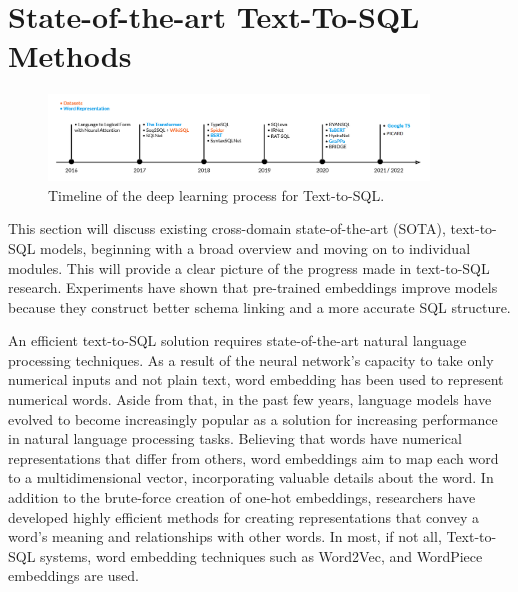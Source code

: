 \section{State-of-the-art Text-To-SQL Methods}

\begin{figure}[htb]
  \centering
  \includegraphics[width=0.9\textwidth]{pics/Timeline.png}
  \caption{Timeline of the deep learning process for Text-to-SQL.}
  \label{fig:timeline}
\end{figure}

This section will discuss existing cross-domain state-of-the-art (SOTA), text-to-SQL models, beginning with a broad overview and moving on to individual modules. This will provide a clear picture of the progress made in text-to-SQL research. Experiments have shown that pre-trained embeddings improve models because they construct better schema linking and a more accurate SQL structure.

An efficient text-to-SQL solution requires state-of-the-art natural language processing techniques.
As a result of the neural network's capacity to take only numerical inputs and not plain text, word embedding has been used to represent numerical words.
Aside from that, in the past few years, language models have evolved to become increasingly popular as a solution for increasing performance in natural language processing tasks.
Believing that words have numerical representations that differ from others, word embeddings aim to map each word to a multidimensional vector, incorporating valuable details about the word. In addition to the brute-force creation of one-hot embeddings, researchers have developed highly efficient methods for creating representations that convey a word's meaning and relationships with other words. In most, if not all, Text-to-SQL systems, word embedding techniques such as Word2Vec\cite{DBLP:journals/corr/Rong14}, and WordPiece embeddings\cite{DBLP:journals/corr/WuSCLNMKCGMKSJL16} are used.

